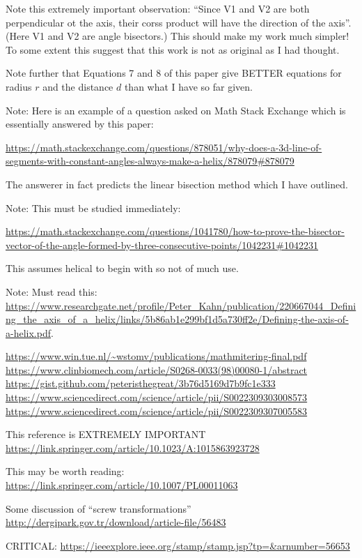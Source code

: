 \documentclass[11pt]{article}
\begin{document}
{Note this extremely important observation: ``Since V1 and V2 are both perpendicular ot the axis, their corss product will have the direction of the axis''. (Here V1 and V2 are angle bisectors.) This should make my work much simpler!  To some extent this suggest that this work is not as original as I had thought.

Note further that Equations 7 and 8 of this paper give BETTER equations for radius $r$ and the distance $d$ than what I have so far given.


Note: Here is an example of a question asked on Math Stack Exchange which is essentially answered by this paper:

\url{https://math.stackexchange.com/questions/878051/why-does-a-3d-line-of-segments-with-constant-angles-always-make-a-helix/878079#878079}

The answerer in fact predicts the linear bisection method which I have outlined.


Note: This must be studied immediately:

\url{https://math.stackexchange.com/questions/1041780/how-to-prove-the-bisector-vector-of-the-angle-formed-by-three-consecutive-points/1042231#1042231}

This assumes helical to begin with so not of much use.

Note: Must read this: \url{https://www.researchgate.net/profile/Peter_Kahn/publication/220667044_Defining_the_axis_of_a_helix/links/5b86ab1e299bf1d5a730ff2e/Defining-the-axis-of-a-helix.pdf}\cite{kahn1989defining}.



\url{https://www.win.tue.nl/~wstomv/publications/mathmitering-final.pdf}
\url{https://www.clinbiomech.com/article/S0268-0033(98)00080-1/abstract}
\url{https://gist.github.com/peteristhegreat/3b76d5169d7b9fc1e333}
\url{https://www.sciencedirect.com/science/article/pii/S0022309303008573}
\url{https://www.sciencedirect.com/science/article/pii/S0022309307005583}

This reference is EXTREMELY IMPORTANT
\url{https://link.springer.com/article/10.1023/A:1015863923728}



This may be worth reading:
\url{https://link.springer.com/article/10.1007/PL00011063}


Some discussion of ``screw transformations''
\url{http://dergipark.gov.tr/download/article-file/56483}

CRITICAL:
\url{https://ieeexplore.ieee.org/stamp/stamp.jsp?tp=&arnumber=56653}


}
\end{document}
